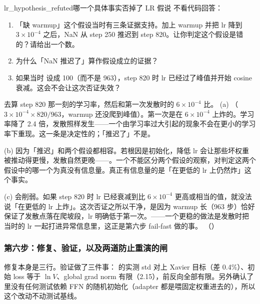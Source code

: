 \begin{checkpoint}{lr_hypothesis_refuted}{哪一个具体事实否掉了 LR 假说}
不看代码回答：
\begin{enumerate}[label=(\alph*)]
  \item 「缺 warmup」这个假设当时有三条证据支持。加上 warmup 并把 lr 降到 $3\times10^{-4}$ 之后，NaN 从 step 250 推迟到 step 820。让你判定这个假设是错的？请给出一个数。
  \item 为什么「NaN 推迟了」算作假设成立的证据？
  \item 如果当时  设成 100（而不是 963），step 820 时 lr 已经过了峰值并开始 cosine 衰减。这会不会让这次否证失效？
\end{enumerate}
\hint 去算 step 820 那一刻的学习率，然后和第一次发散时的 $6\times10^{-4}$ 比。
\ifshowanswers
\tcblower
\answer (a) （$3\times10^{-4}\times820/963$，warmup 还没爬到峰值）。第一次是在 $6\times10^{-4}$ 上炸的。学习率降了 2.4 倍，发散照样发生——一个由学习率过大引起的现象不会在更小的学习率下重现。这一条是决定性的；「推迟了」不是。

(b) 因为「推迟」和两个假设都相容。若根因是初始化，降低 lr 会让那些坏权重被推动得更慢，发散自然更晚——。一个不能区分两个假设的观察，对判定这两个假设中的哪一个为真没有信息量。真正有信息量的是「在更低的 lr 上仍然炸」这个事实。

(c) 会削弱。如果 step 820 时 lr 已经衰减到比 $6\times10^{-4}$ 更高或相当的值，就没法说「在更低的 lr 上炸」。这次否证之所以干净，是因为 warmup 长（963 步）恰好保证了发散点落在爬坡段，lr 明确低于第一次。——一个更稳的做法是发散时把当时的 lr 一起打进异常信息里，这正是第六步 fail-fast 做的事。
\whereincode {}（）
\fi
\end{checkpoint}

\subsubsection*{第六步：修复、验证，以及两道防止重演的闸}

修复本身是三行。验证做了三件事： 的实测 std 对上 Xavier 目标（差 0.4\%）、初始 loss 等于 $\ln V$、global grad norm 有限（2.15），前反向全部有限。另外确认了  里没有任何测试依赖 FFN 的随机初始化（adapter 都是喂固定权重进去的），所以这个改动不动测试基线。

